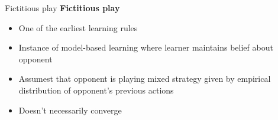 \begin{comment}
\begin{frame}{Learning rules}
    \textbf{Two types of theories}
    \begin{itemize}
        \item Descriptive theories: theories that attempt to study the way learning takes place in real life
        \item Prescriptive theories: theories that study the way agents \textit{should} react in real life
    \end{itemize}
\end{frame}

\begin{frame}{Descriptive theories}
    \textbf{Properties}
    \begin{itemize}
        \item \textbf{Realism}: There should be a good match between the formal theory and the natural phenomenon being studied
        \item \textbf{Convergence}: The theory should exhibit convergence of the strategy profile to some equilibrium
    \end{itemize}
\end{frame}

\begin{frame}{Prescriptive theories}
    \textbf{Properties}
    \begin{itemize}
        \item \textbf{Safety}: Guarantees the agent at least learning rule its maxmin payoff, or “security value.”
        \item \textbf{Rationality}: Whenever the opponent's learning rule settles on a stationary strategy the agent settles on a best response to that strategy
        \item \textbf{No-regret}: Yields a better result that any pure strategy the agent could have played
    \end{itemize}
\end{frame}
\end{comment}
\begin{frame}{Fictitious play}
    \textbf{Fictitious play}
    \begin{itemize}
        \item One of the earliest learning rules 
        \item Instance of model-based learning where learner maintains belief about opponent
        \item Assumest that opponent is playing mixed strategy given by empirical distribution of opponent’s previous actions
        \item Doesn't necessarily converge
    \end{itemize}
\end{frame}

